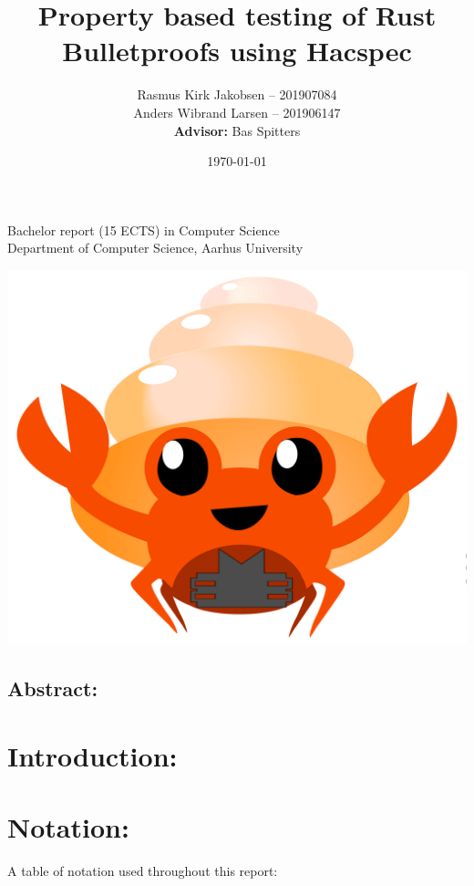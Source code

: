 \documentclass{article}
\title{Property based testing of Rust Bulletproofs using Hacspec}
\author{ 
Rasmus Kirk Jakobsen -- 201907084\\
Anders Wibrand Larsen -- 201906147\\
\textbf{Advisor:} Bas Spitters
}
\date{\today}
\begin{document}
\maketitle

\begin{center}
    Bachelor report (15 ECTS) in Computer Science\\
Department of Computer Science, Aarhus University\\
\end{center} 

\begin{center}
	\includegraphics[scale=0.4]{img/bulletproof-hacspec-2.png}
\end{center} 

\subsection*{Abstract:}

\tableofcontents

\newpage


\section{Introduction:} \label{Introduction}
\section{Notation:} \label{notation}

A table of notation used throughout this report:
\end{document}

